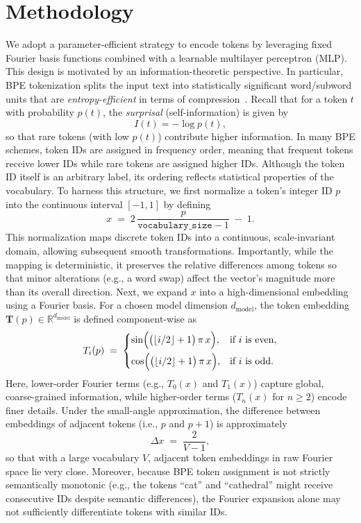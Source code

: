\documentclass{article}
\begin{document}
\section{Methodology}
We adopt a parameter-efficient strategy to encode tokens by leveraging fixed Fourier basis functions combined with a learnable multilayer perceptron (MLP). This design is motivated by an information-theoretic perspective. In particular, BPE tokenization splits the input text into statistically significant word/subword units that are \emph{entropy-efficient} in terms of compression~\cite{sennrich2016neural}. Recall that for a token \(t\) with probability \(p(t)\), the \emph{surprisal} (self-information) is given by
\[
I(t) = -\log p(t),
\]
so that rare tokens (with low \(p(t)\)) contribute higher information. In many BPE schemes, token IDs are assigned in frequency order, meaning that frequent tokens receive lower IDs while rare tokens are assigned higher IDs. Although the token ID itself is an arbitrary label, its ordering reflects statistical properties of the vocabulary.
To harness this structure, we first normalize a token's integer ID \(p\) into the continuous interval \([-1,1]\) by defining
\[
x \;=\; 2\,\frac{p}{\texttt{vocabulary\_size}-1} \;-\; 1.
\]
This normalization maps discrete token IDs into a continuous, scale-invariant domain, allowing subsequent smooth transformations. Importantly, while the mapping is deterministic, it preserves the relative differences among tokens so that minor alterations (e.g., a word swap) affect the vector's magnitude more than its overall direction.
Next, we expand \(x\) into a high-dimensional embedding using a Fourier basis. For a chosen model dimension \(d_{\mathrm{model}}\), the token embedding \(\mathbf{T}(p) \in \mathbb{R}^{d_{\mathrm{model}}}\) is defined component-wise as
\[
T_{i}(p) 
\;=\;
\begin{cases}
\sin\Bigl(\bigl(\lfloor i/2 \rfloor + 1\bigr)\,\pi\,x\Bigr), & \text{if } i \text{ is even},\\[6pt]
\cos\Bigl(\bigl(\lfloor i/2 \rfloor + 1\bigr)\,\pi\,x\Bigr), & \text{if } i \text{ is odd}.
\end{cases}
\]
Here, lower-order Fourier terms (e.g., \(T_0(x)\) and \(T_1(x)\)) capture global, coarse-grained information, while higher-order terms (\(T_n(x)\) for \(n\geq2\)) encode finer details. Under the small-angle approximation, the difference between embeddings of adjacent tokens (i.e., \(p\) and \(p+1\)) is approximately
\[
\Delta x \;=\; \frac{2}{V-1},
\]
so that with a large vocabulary \(V\), adjacent token embeddings in raw Fourier space lie very close. Moreover, because BPE token assignment is not strictly semantically monotonic (e.g., the tokens ``cat'' and ``cathedral'' might receive consecutive IDs despite semantic differences), the Fourier expansion alone may not sufficiently differentiate tokens with similar IDs.
\end{document}
